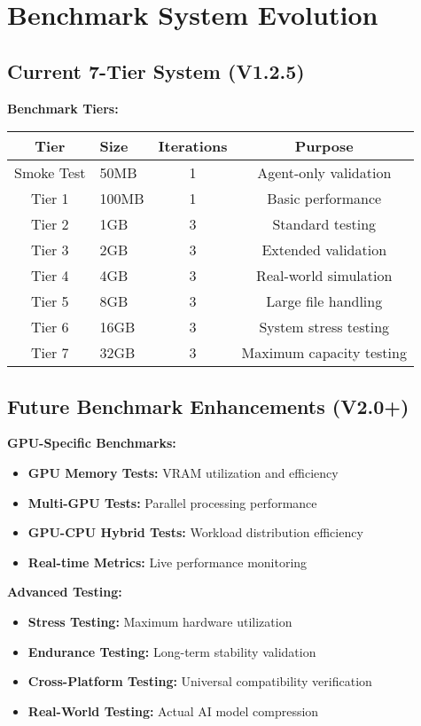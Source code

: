 \documentclass[12pt,a4paper]{article}
\begin{document}
\section{Benchmark System Evolution}

\subsection{Current 7-Tier System (V1.2.5)}

\textbf{Benchmark Tiers:}
\begin{center}
\begin{tabular}{|c|l|c|c|}
\hline
\textbf{Tier} & \textbf{Size} & \textbf{Iterations} & \textbf{Purpose} \\
\hline
Smoke Test & 50MB & 1 & Agent-only validation \\
Tier 1 & 100MB & 1 & Basic performance \\
Tier 2 & 1GB & 3 & Standard testing \\
Tier 3 & 2GB & 3 & Extended validation \\
Tier 4 & 4GB & 3 & Real-world simulation \\
Tier 5 & 8GB & 3 & Large file handling \\
Tier 6 & 16GB & 3 & System stress testing \\
Tier 7 & 32GB & 3 & Maximum capacity testing \\
\hline
\end{tabular}
\end{center}

\subsection{Future Benchmark Enhancements (V2.0+)}

\textbf{GPU-Specific Benchmarks:}
\begin{itemize}
    \item \textbf{GPU Memory Tests:} VRAM utilization and efficiency
    \item \textbf{Multi-GPU Tests:} Parallel processing performance
    \item \textbf{GPU-CPU Hybrid Tests:} Workload distribution efficiency
    \item \textbf{Real-time Metrics:} Live performance monitoring
\end{itemize}

\textbf{Advanced Testing:}
\begin{itemize}
    \item \textbf{Stress Testing:} Maximum hardware utilization
    \item \textbf{Endurance Testing:} Long-term stability validation
    \item \textbf{Cross-Platform Testing:} Universal compatibility verification
    \item \textbf{Real-World Testing:} Actual AI model compression
\end{itemize}
\end{document}
